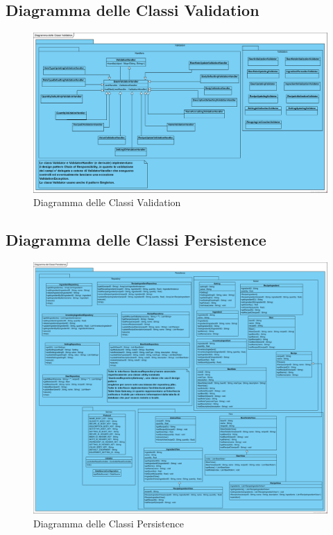 \documentclass[a4paper,12pt]{report}
\begin{document}
		\subsection{Diagramma delle Classi Validation}
			\begin{figure}[!h]
				\centering
				\includegraphics[width=0.9\linewidth]{image/Diagramma-delle-Classi-Validation.png}
				\caption{Diagramma delle Classi Validation}\label{fig:1}
			\end{figure}           
\newpage
		\subsection{Diagramma delle Classi Persistence}
			\begin{figure}[!h]
				\centering
				\includegraphics[width=01\linewidth]{image/Diagramma-delle-Classi-Persistence.png}
				\caption{Diagramma delle Classi Persistence}\label{fig:1}
			\end{figure}             
\end{document}
